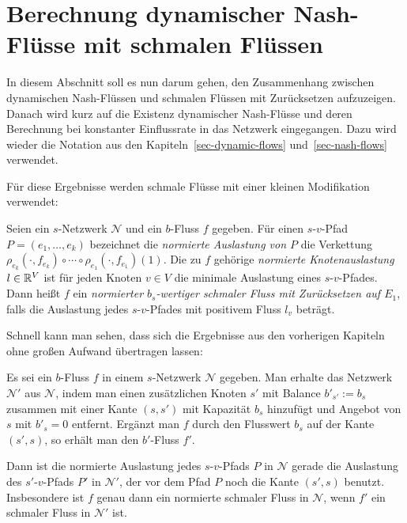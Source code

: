 \section{Berechnung dynamischer Nash-Flüsse mit schmalen Flüssen}\label{sec-nash-flow-extension}
In diesem Abschnitt soll es nun darum gehen, den Zusammenhang zwischen dynamischen Nash-Flüssen und schmalen Flüssen mit Zurücksetzen aufzuzeigen.
Danach wird kurz auf die Existenz dynamischer Nash-Flüsse und deren Berechnung bei konstanter Einflussrate in das Netzwerk eingegangen.
Dazu wird wieder die Notation aus den Kapiteln~\ref{sec-dynamic-flows} und~\ref{sec-nash-flows} verwendet.

Für diese Ergebnisse werden schmale Flüsse mit einer kleinen Modifikation verwendet:

\begin{definition}
	Seien ein $s$-Netzwerk $\mathcal{N}$ und ein $b$-Fluss $f$ gegeben.
	Für einen $s$-$v$-Pfad $P=(e_1, \dots, e_k)$ bezeichnet die \emph{normierte Auslastung von $P$} die Verkettung $\rho_{e_k}(\cdot, f_{e_k}) \circ \cdots \circ \rho_{e_1}(\cdot, f_{e_1})(1)$.
	Die zu $f$ gehörige \emph{normierte Knotenauslastung} $l\in\mathbb{R}^V$ ist für jeden Knoten $v\in V$ die minimale Auslastung eines $s$-$v$-Pfades.
	Dann heißt $f$ ein \emph{normierter $b_s$-wertiger schmaler Fluss mit Zurücksetzen auf $E_1$}, falls die Auslastung jedes $s$-$v$-Pfades mit positivem Fluss $l_v$ beträgt.
\end{definition}

Schnell kann man sehen, dass sich die Ergebnisse aus den vorherigen Kapiteln ohne großen Aufwand übertragen lassen:

\begin{proposition}
	Es sei ein $b$-Fluss $f$ in einem $s$-Netzwerk $\mathcal{N}$ gegeben.
	Man erhalte das Netzwerk $\mathcal{N}'$ aus $\mathcal{N}$, indem man einen zusätzlichen Knoten $s'$ mit Balance $b'_{s'} := b_s$ zusammen mit einer Kante $(s, s')$ mit Kapazität $b_s$ hinzufügt und Angebot von $s$ mit $b'_s = 0$ entfernt.
	Ergänzt man $f$ durch den Flusswert $b_s$ auf der Kante $(s', s)$, so erhält man den $b'$-Fluss $f'$.
	
	Dann ist die normierte Auslastung jedes $s$-$v$-Pfads $P$ in $\mathcal{N}$ gerade die Auslastung des $s'$-$v$-Pfads $P'$ in $\mathcal{N}'$, der vor dem Pfad $P$ noch die Kante $(s', s)$ benutzt.
	Insbesondere ist $f$ genau dann ein normierte schmaler Fluss in $\mathcal{N}$, wenn $f'$ ein schmaler Fluss in $\mathcal{N'}$ ist.
\end{proposition}


